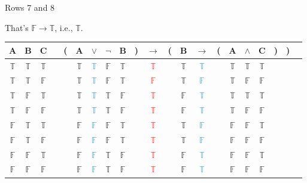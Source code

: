 \documentclass[
  ignorenonframetext,
]{beamer}
\renewcommand{\,}{\text{, }}
\def\True{\mathbb{T}}
\def\False{\mathbb{F}}
\begin{document}
\begin{frame}{Rows 7 and 8}
\protect\hypertarget{rows-7-and-8-1}{}

That's \(\False \rightarrow \True\), i.e., \(\True\).

\begin{center}
\bigskip
\begin{tabular}{@{ }c@{ }@{ }c@{ }@{ }c | c@{ }@{}c@{}@{ }c@{ }@{ }c@{ }@{ }c@{ }@{ }c@{ }@{}c@{}@{ }c@{ }@{}c@{}@{ }c@{ }@{ }c@{ }@{}c@{}@{ }c@{ }@{ }c@{ }@{ }c@{ }@{}c@{}@{}c@{}@{ }c}
A & B & C &  & ( & A & $\vee$ & $\neg$ & B & ) & $\rightarrow$ & ( & B & $\rightarrow$ & ( & A & $\wedge$ & C & ) & ) & \\
\hline 
 $\True$ & $\True$ & $\True$ &  &  & $\True$ & \textcolor{dodgerblue}{$\True$} & $\False$ & $\True$ &  &\textcolor{red}{$\True$}&  & $\True$ & \textcolor{dodgerblue}{$\True$} &  & $\True$ & $\True$ & $\True$ &  &  & \\
 $\True$ & $\True$ & $\False$ &  &  & $\True$ & \textcolor{dodgerblue}{$\True$} & $\False$ & $\True$ &  &\textcolor{red}{$\False$}&  & $\True$ & \textcolor{dodgerblue}{$\False$} &  & $\True$ & $\False$ & $\False$ &  &  & \\
 $\True$ & $\False$ & $\True$ &  &  & $\True$ & \textcolor{dodgerblue}{$\True$} & $\True$ & $\False$ &  &\textcolor{red}{$\True$}&  & $\False$ & \textcolor{dodgerblue}{$\True$} &  & $\True$ & $\True$ & $\True$ &  &  & \\
 $\True$ & $\False$ & $\False$ &  &  & $\True$ & \textcolor{dodgerblue}{$\True$} & $\True$ & $\False$ &  &\textcolor{red}{$\True$}&  & $\False$ & \textcolor{dodgerblue}{$\True$} &  & $\True$ & $\False$ & $\False$ &  &  & \\
 $\False$ & $\True$ & $\True$ &  &  & $\False$ & \textcolor{dodgerblue}{$\False$} & $\False$ & $\True$ &  &\textcolor{red}{$\True$}&  & $\True$ & \textcolor{dodgerblue}{$\False$} &  & $\False$ & $\False$ & $\True$ &  &  & \\
 $\False$ & $\True$ & $\False$ &  &  & $\False$ & \textcolor{dodgerblue}{$\False$} & $\False$ & $\True$ &  &\textcolor{red}{$\True$}&  & $\True$ & \textcolor{dodgerblue}{$\False$} &  & $\False$ & $\False$ & $\False$ &  &  & \\
 $\False$ & $\False$ & $\True$ &  &  & $\False$ & \textcolor{dodgerblue}{$\False$} & $\True$ & $\False$ &  &\textcolor{red}{$\True$}&  & $\False$ & \textcolor{dodgerblue}{$\True$} &  & $\False$ & $\False$ & $\True$ &  &  & \\
 $\False$ & $\False$ & $\False$ &  &  & $\False$ & \textcolor{dodgerblue}{$\False$} & $\True$ & $\False$ &  &\textcolor{red}{$\True$}&  & $\False$ & \textcolor{dodgerblue}{$\True$} &  & $\False$ & $\False$ & $\False$ &  &  & \\
\end{tabular}
\bigskip
\end{center}

\end{frame}
\end{document}
